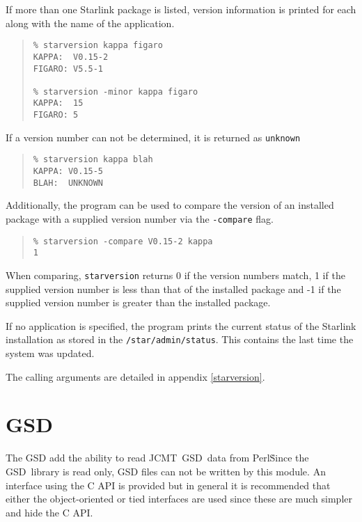 \documentclass[twoside,11pt]{article}
\newenvironment{myquote}{\begin{quote}\begin{small}}{\end{small}\end{quote}}
\newcommand{\gsd}{\xref{{GSD}}{sun229}{}}
\newcommand{\perl}{\xref{\textsf{Perl}}{sun193}{}}
\newcommand{\jcmt}{\htmladdnormallink{JCMT}{http://www.jach.hawaii.edu/JACpublic/JCMT}}
\newcommand{\htmladdnormallink}[2]{#1}
\newcommand{\xref}[3]{#1}
\renewcommand{\_}{\texttt{\symbol{95}}}
\begin{document}
If more than one Starlink package is listed, version information
is printed for each along with the name of the application.

\begin{myquote}
\begin{verbatim}
% starversion kappa figaro
KAPPA:  V0.15-2
FIGARO: V5.5-1

% starversion -minor kappa figaro
KAPPA:  15
FIGARO: 5
\end{verbatim}
\end{myquote}


If a version number can not be determined, it is returned as \texttt{unknown}

\begin{myquote}
\begin{verbatim}
% starversion kappa blah
KAPPA: V0.15-5
BLAH:  UNKNOWN
\end{verbatim}
\end{myquote}

Additionally, the program can be used to compare the version of 
an installed package with a supplied version number via the
\texttt{-compare} flag.

\begin{myquote}
\begin{verbatim}
% starversion -compare V0.15-2 kappa
1
\end{verbatim}
\end{myquote}

When comparing, \texttt{starversion} returns 0 if the version numbers match,
1 if the supplied version number is less than that of the installed
package and -1 if the supplied version number is greater than the
installed package.



If no application is specified, the program prints the current status
of the Starlink installation as stored in the \texttt{/star/admin/status}.
This contains the last time the system was updated.



The calling arguments are detailed in appendix \ref{starversion}.

\section{GSD}

The GSD add the ability to read \jcmt\ \gsd\ data from \perl\. Since the
\gsd\ library is read only, GSD files can not be written by this module.
An interface using the C API is provided but in general it is recommended
that either the object-oriented or tied interfaces are used since these
are much simpler and hide the C API.
\end{document}

